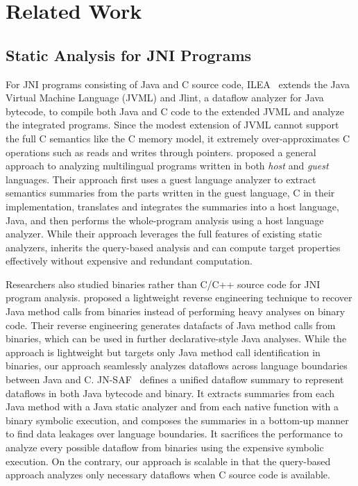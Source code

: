 \section{Related Work}\label{sec:related}
\subsection{Static Analysis for JNI Programs}
For JNI programs consisting of Java and C source code, ILEA~\cite{ILEA} extends
the Java Virtual Machine Language (JVML) and Jlint, a dataflow analyzer for
Java bytecode, to compile both Java and C code to the extended JVML and analyze
the integrated programs.  Since the modest extension of JVML cannot
support the full C semantics like the C memory model, it extremely over-approximates C
operations such as reads and writes through pointers.  \citet{LeeASE20}
proposed a general approach to analyzing multilingual programs written in both
{\it host} and {\it guest} languages.  Their approach first uses a guest
language analyzer to extract semantics summaries from the parts written in the
guest language, C in their implementation, translates and integrates the
summaries into a host language, Java, and then performs the whole-program
analysis using a host language analyzer.  While their approach leverages the
full features of existing static analyzers, \ours inherits the query-based
analysis and can compute target properties effectively without expensive and
redundant computation.

Researchers also studied binaries rather than C/C++ source code
for JNI program analysis.  \citet{scanning} proposed a lightweight reverse engineering technique to
recover Java method calls from binaries instead of performing heavy analyses on
binary code.  Their reverse engineering generates datafacts of Java method
calls from binaries, which can be used in further declarative-style Java
analyses. While the approach is lightweight but targets only Java method call
identification in binaries, our approach seamlessly analyzes dataflows across language
boundaries between Java and C.  JN-SAF~\cite{JN-SAF} defines a
unified dataflow summary to represent dataflows in both Java bytecode and
binary.  It extracts summaries from each Java method with a Java static
analyzer and from each native function with a binary symbolic execution, and
composes the summaries in a bottom-up manner to find data leakages over
language boundaries.  It sacrifices the performance to analyze every possible
dataflow from binaries using the expensive symbolic execution. On the contrary, our
approach is scalable in that the query-based approach analyzes only necessary
dataflows when C source code is available.


